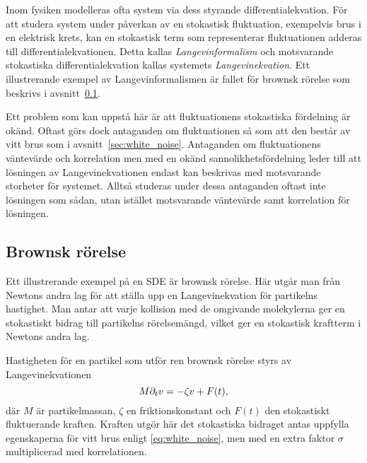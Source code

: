 Inom fysiken modelleras ofta system via dess styrande differentialekvation. För att studera system under påverkan av en stokastisk fluktuation, exempelvis brus i en elektrisk krets, kan en stokastisk term som representerar fluktuationen adderas till differentialekvationen. Detta kallas \emph{Langevinformalism} och motsvarande stokastiska differentialekvation kallas systemets \emph{Langevinekvation}. Ett illustrerande exempel av Langevinformalismen är fallet för brownsk rörelse som beskrivs i avsnitt~\ref{sec:brown}.

Ett problem som kan uppstå här är att fluktuationens stokastiska fördelning är okänd. Oftast görs dock antaganden om fluktuationen så som att den består av vitt brus som i avsnitt~\ref{sec:white_noise}. 
Antaganden om fluktuationens väntevärde och korrelation men med en okänd sannolikhetsfördelning leder till att lösningen av Langevinekvationen endast kan beskrivas med motsvarande storheter för systemet. Alltså studeras under dessa antaganden oftast inte lösningen som sådan, utan istället motsvarande väntevärde samt korrelation för lösningen.  






\subsection{Brownsk rörelse}\label{sec:brown}
Ett illustrerande exempel på en SDE är brownsk rörelse. Här utgår man från Newtons andra lag för att ställa upp en Langevinekvation för partikelns hastighet. Man antar att varje kollision med de omgivande molekylerna ger en stokastiskt bidrag till partikelns rörelsemängd, vilket ger en stokastisk kraftterm i Newtons andra lag.

Hastigheten för en partikel som utför ren brownsk rörelse styrs av
Langevinekvationen~\cite{Mazo_Brownian2002} 
\begin{equation} \label{eq:Brownian_SDE}
    M\partial_tv=-\zeta v + F(t),
\end{equation}
där $M$ är partikelmassan, $\zeta$ en friktionskonstant och $F(t)$ den stokastiskt fluktuerande kraften. Kraften utgör här det stokastiska bidraget antas uppfylla egenskaperna för vitt brus enligt \eqref{eq:white_noise}, men med en extra faktor $\sigma$ multiplicerad med korrelationen.


